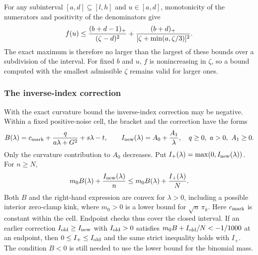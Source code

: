 For any subinterval $[a,d]\subseteq[l,h]$ and $u\in[a,d]$, monotonicity
of the numerators and positivity of the denominators give
\[
 f(u)\le \frac{(b+d-1)_+}{(\zeta-d)^2}
       +\frac{(b+d)_+}{[\zeta+\min(a,\zeta/3)]^2}.
\]
The exact maximum is therefore no larger than the largest of these bounds
over a subdivision of the interval. For fixed $b$ and $u$, $f$ is nonincreasing in $\zeta$, so a bound computed
with the smallest admissible $\zeta$ remains valid for larger ones.

\subsubsection{The inverse-index correction}
With the exact curvature bound the inverse-index correction may be
negative. Within a fixed positive-noise cell, the bracket and the
correction have the forms
\[
 B(\lambda)=c_{\rm mark}+\frac{q}{a\lambda+G^2}+s\lambda-t,\qquad
 I_{\rm new}(\lambda)=A_0+\frac{A_1}{\lambda},
 \quad q\ge0,\ a>0,\ A_1\ge0.
\]
Only the curvature contribution to $A_0$ decreases. Put
$I_+(\lambda)=\max(0,I_{\rm new}(\lambda))$. For $n\ge N$,
\[
 m_0B(\lambda)+\frac{I_{\rm new}(\lambda)}n
 \le m_0B(\lambda)+\frac{I_+(\lambda)}N.
\]
Both $B$ and the right-hand expression are convex for $\lambda>0$,
including a possible interior zero-clamp kink, where $m_0>0$ is a lower bound for $\sqrt n\,\pi_k$.
Here $c_{\rm mark}$ is constant within the cell.
Endpoint checks thus cover the closed interval. If an earlier correction
$I_{\rm old}\ge I_{\rm new}$ with $I_{\rm old}>0$ satisfies
$m_0B+I_{\rm old}/N<-1/1000$ at an endpoint, then $0\le I_+\le I_{\rm old}$
and the same strict inequality holds with $I_+$. The condition $B<0$ is
still needed to use the lower bound for the binomial mass.
